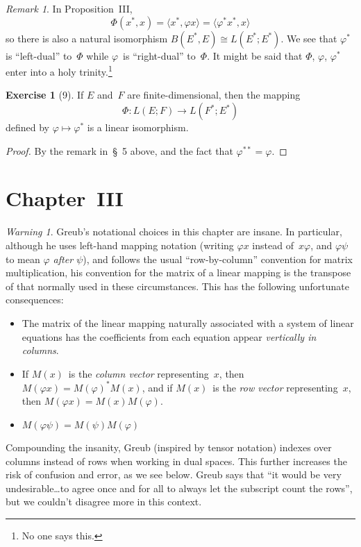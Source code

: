 \documentclass[letterpaper,12pt]{article}
\newcommand{\iso}{\cong}
\newcommand{\sprod}[2]{\langle#1,#2\rangle}
\theoremstyle{definition}
\newtheorem*{exer}{Exercise}
\theoremstyle{remark}
\newtheorem*{rmk}{Remark}
\newtheorem*{warn}{Warning}
\begin{document}
\begin{rmk}
In Proposition~III,
\[\Phi(x^*,x)=\sprod{x^*}{\varphi x}=\sprod{\varphi^* x^*}{x}\]
so there is also a natural isomorphism \(B(E^*,E)\iso L(E^*;E^*)\). We see that \(\varphi^*\) is ``left-dual'' to~\(\Phi\) while \(\varphi\)~is ``right-dual'' to~\(\Phi\). It might be said that \(\Phi\), \(\varphi\), \(\varphi^*\) enter into a holy trinity.\footnote{No one says this.}
\end{rmk}

\begin{exer}[9]
If \(E\) and~\(F\) are finite-dimensional, then the mapping
\[\Phi:L(E;F)\to L(F^*;E^*)\]
defined by \(\varphi\mapsto\varphi^*\) is a linear isomorphism.
\end{exer}
\begin{proof}
By the remark in~\S~5 above, and the fact that \(\varphi^{**}=\varphi\).
\end{proof}

\newpage
\section*{Chapter~III}
\begin{warn}
Greub's notational choices in this chapter are insane. In particular, although he uses left-hand mapping notation (writing \(\varphi x\) instead of~\(x\varphi\), and \(\varphi\psi\) to mean \emph{\(\varphi\) after \(\psi\)}), and follows the usual ``row-by-column'' convention for matrix multiplication, his convention for the matrix of a linear mapping is the transpose of that normally used in these circumstances. This has the following unfortunate consequences:
\begin{itemize}
\item The matrix of the linear mapping naturally associated with a system of linear equations has the coefficients from each equation appear \emph{vertically in columns}.
\item If \(M(x)\)~is the \emph{column vector} representing~\(x\), then \(M(\varphi x)=M(\varphi)^*M(x)\), and if \(M(x)\)~is the \emph{row vector} representing~\(x\), then \(M(\varphi x)=M(x)M(\varphi)\).
\item \(M(\varphi\psi)=M(\psi)M(\varphi)\)
\end{itemize}
Compounding the insanity, Greub (inspired by tensor notation) indexes over columns instead of rows when working in dual spaces. This further increases the risk of confusion and error, as we see below. Greub says that ``it would be very undesirable\dots to agree once and for all to always let the subscript count the rows'', but we couldn't disagree more in this context.
\end{warn}
\end{document}
